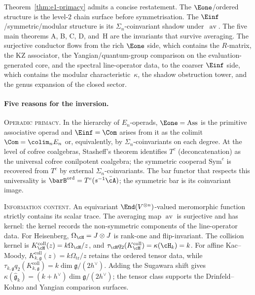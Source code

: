 \begin{principle}
\label{princ:e1-primacy}
Theorem~\textup{\ref{thm:e1-primacy}} admits a concise restatement.
The $\Eone$/ordered structure is the level-$2$ chain surface before
symmetrisation. The $\Einf$/symmetric/modular structure is its
$\Sigma_n$-coinvariant shadow under~$\operatorname{av}$.
The five main theorems A, B, C, D, and~H are the invariants that survive
averaging. The surjective conductor flows from the rich $\Eone$ side,
which contains the $R$-matrix, the
KZ associator, the Yangian/quantum-group comparison on the
evaluation-generated core, and the spectral line-operator data,
to the coarser $\Einf$ side, which contains the modular
characteristic~$\kappa$, the shadow obstruction tower, and the
genus expansion of the closed sector.
\end{principle}

\paragraph{Five reasons for the inversion.}
\textsc{Operadic primacy.} In the hierarchy of $E_n$-operads,
$\Eone = \mathrm{Ass}$ is the primitive associative operad and
$\Einf = \Com$ arises from it as the colimit
$\Com = \colim_n E_n$ or, equivalently, by
$\Sigma_n$-coinvariants on each degree. At the level of cofree
coalgebras, Stasheff's theorem identifies $T^c$ (deconcatenation)
as the universal cofree conilpotent coalgebra; the symmetric
cooperad $\mathrm{Sym}^c$ is recovered from $T^c$ by external
$\Sigma_n$-coinvariants. The bar functor that respects this
universality is $\barB^{\mathrm{ord}} = T^c(s^{-1}\bar\cA)$; the
symmetric bar is its coinvariant image.

\textsc{Information content.} An equivariant
$\End(V^{\otimes n})$-valued meromorphic function strictly
contains its scalar trace. The averaging map
$\operatorname{av}$ is surjective and has kernel: the kernel
records the non-symmetric components of the line-operator data.
For Heisenberg, $\Omega_{\cH}=J\otimes J$ is rank-one and
flip-invariant.  The collision kernel is
$K_{\cH}^{\mathrm{coll}}(z)=k\Omega_{\cH}/z$, and
$\tau_{\cH}q_2(K_{\cH}^{\mathrm{coll}})=\kappa(\cH_k)=k$.
For affine Kac--Moody,
$K_{k,\mathfrak g}^{\mathrm{coll}}(z)=k\Omega_{\mathrm{tr}}/z$
retains the ordered tensor data, while
$\tau_{k,\mathfrak g}q_2(K_{k,\mathfrak g}^{\mathrm{coll}})
=k\dim\mathfrak g/(2h^\vee)$.  Adding the Sugawara shift gives
$\kappa(\widehat{\mathfrak g}_k)
=(k+h^\vee)\dim\mathfrak g/(2h^\vee)$; the tensor class supports the
Drinfeld--Kohno and Yangian comparison surfaces.

